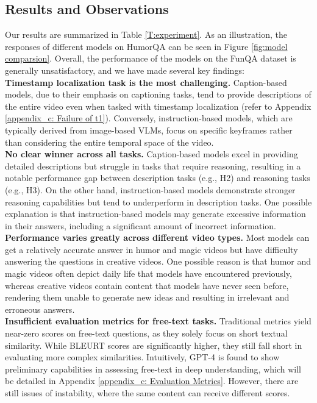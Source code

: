 \subsection{Results and Observations}
Our results are summarized in Table \ref{T:experiment}. As an illustration, the responses of different models on HumorQA can be seen in Figure \ref{fig:model comparsion}. Overall, the performance of the models on the FunQA dataset is generally unsatisfactory, and we have made several key findings:\\
\noindent\textbf{Timestamp localization task is the most challenging.}\quad
Caption-based models, due to their emphasis on captioning tasks, tend to provide descriptions of the entire video even when tasked with timestamp localization (refer to Appendix \ref{appendix_c: Failure of t1}). Conversely, instruction-based models, which are typically derived from image-based VLMs, focus on specific keyframes rather than considering the entire temporal space of the video.\\
\noindent\textbf{No clear winner across all tasks.}\quad
Caption-based models excel in providing detailed descriptions but struggle in tasks that require reasoning, resulting in a notable performance gap between description tasks (e.g., H2) and reasoning tasks (e.g., H3). On the other hand, instruction-based models demonstrate stronger reasoning capabilities but tend to underperform in description tasks. One possible explanation is that instruction-based models may generate excessive information in their answers, including a significant amount of incorrect information.\\
\noindent\textbf{Performance varies greatly across different video types.}\quad
Most models can get a relatively accurate answer in humor and magic videos but have difficulty answering the questions in creative videos. One possible reason is that humor and magic videos often depict daily life that models have encountered previously, whereas creative videos contain content that models have never seen before, rendering them unable to generate new ideas and resulting in irrelevant and erroneous answers.\\
\noindent\textbf{Insufficient evaluation metrics for free-text tasks.}\quad
Traditional metrics yield near-zero scores on free-text questions, as they solely focus on short textual similarity. While BLEURT scores are significantly higher, they still fall short in evaluating more complex similarities. Intuitively, GPT-4 is found to show preliminary capabilities in assessing free-text in deep understanding, which will be detailed in Appendix \ref{appendix_c: Evaluation Metrics}. However, there are still issues of instability, where the same content can receive different scores.\\
